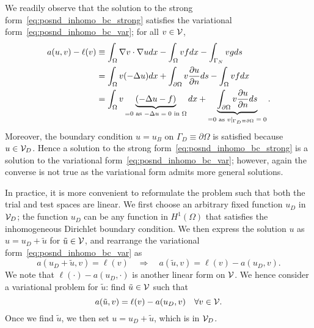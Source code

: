 We readily observe that the solution to the strong form~\eqref{eq:posnd_inhomo_bc_strong} satisfies the variational form~\eqref{eq:posnd_inhomo_bc_var};  for all $v \in \mathcal{V}$,
\begin{align*}
  a(u,v) - \ell(v)
  &\equiv \int_\Omega \nabla v \cdot \nabla u dx - \int_\Omega vf dx - \int_{\Gamma_N} vg ds
  \\
  &= \int_\Omega v (-\Delta u) dx + \int_{\partial \Omega} v \frac{\partial u}{\partial n} ds  - \int_\Omega vf dx 
  \\
  &= \int_\Omega v \underbrace{ (-\Delta u - f) }_{= 0 \text{ as $-\Delta u=  0$ in $\Omega$}} dx
  + \underbrace{ \int_{\partial \Omega} v \frac{\partial u}{\partial n} ds }_{= 0 \text{ as $v|_{\Gamma_D \equiv \partial \Omega} = 0$}}.
\end{align*}
Moreover, the boundary condition $u = u_B$ on $\Gamma_D \equiv \partial \Omega$ is satisfied because $u \in \mathcal{V}_D$. 
Hence a solution to the strong form~\eqref{eq:posnd_inhomo_bc_strong} is a solution to the variational form~\eqref{eq:posnd_inhomo_bc_var}; however, again the converse is not true as the variational form admits more general solutions.

In practice, it is more convenient to reformulate the problem such that both the trial and test spaces are linear.  We first choose an arbitrary fixed function $u_D$ in $\mathcal{V}_D$; the function $u_D$ can be any function in $H^1(\Omega)$ that satisfies the inhomogeneous Dirichlet boundary condition. We then express the solution $u$ as $u = u_D + \tilde u$ for $\tilde u \in \mathcal{V}$, and rearrange the variational form~\eqref{eq:posnd_inhomo_bc_var} as
\begin{equation*}
  a(u_D + \tilde u,v) = \ell(v) \quad \Rightarrow \quad
  a(\tilde u,v) = \ell(v) - a(u_D,v).
\end{equation*}
We note that $\ell(\cdot) - a(u_D,\cdot)$ is another linear form on $\mathcal{V}$. We hence consider a variational problem for $\tilde u$: find $\tilde u \in \mathcal{V}$ such that
\begin{equation*}
  a(\tilde u,v) = \ell(v) - a(u_D,v) \quad \forall v \in \mathcal{V}.
\end{equation*}
Once we find $\tilde u$, we then set $u = u_D + \tilde u$, which is in $\mathcal{V}_D$.


